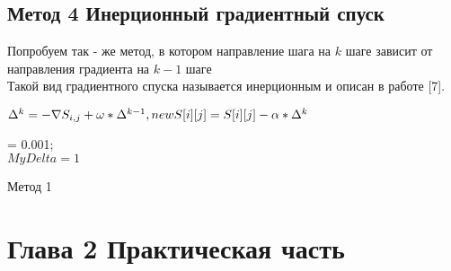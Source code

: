 \documentclass[ 12pt,x11names]{article}
\begin{document}
    \subsection{Метод 4 Инерционный градиентный спуск}
    Попробуем так - же метод, в котором направление шага на $k$ шаге зависит от направления градиента на $k - 1$ шаге\\
    Такой вид градиентного спуска называется инерционным и описан в работе [7].
    \\
      \begin{center}
     $\Delta^k = -\nabla S_{i, j} + \omega * \Delta ^  {k-1} , \\
		            newS[i][j] = S[i][j] - \alpha * \Delta^k $\\
     \end{center}
    \begin{algorithm}[H]
		\SetAlgoLined
		\alpha = 0.001;\\
		$ MyDelta  = 1$\\
	\caption{Метод 1}
    \end{algorithm}
    \newpage
    \section{
    Глава 2
    Практическая часть}
\end{document}
